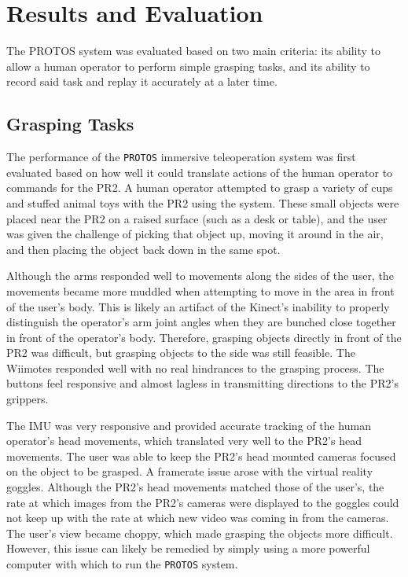 \documentclass{sig-alternate}
\begin{document}
\section{Results and Evaluation}
\label{sec:results}
The PROTOS system was evaluated based on two main criteria: its ability to allow a human operator to perform simple grasping tasks, and its ability to record said task
and replay it accurately at a later time. 

\subsection{Grasping Tasks}
\indent The performance of the {\tt PROTOS} immersive teleoperation system was first
evaluated based on how well it could translate actions of
the human operator to commands for the PR2. A human operator attempted to grasp a variety of cups and stuffed animal toys 
with the PR2 using the system. These small objects were placed near the PR2 on a raised surface (such as a desk or table), and the user was given the challenge of
picking that object up, moving it around in the air, and then placing the object back down in the same spot.

\indent Although the arms responded well to movements along the sides of the user, the movements became more
muddled when attempting to move in the area in front of the user's body. This is likely an artifact of the Kinect's inability to properly distinguish the operator's arm 
joint angles when they are bunched close together in front of the operator's body. Therefore, grasping objects directly in front of the PR2 was difficult, but grasping
objects to the side was still feasible. The Wiimotes responded well with no real hindrances to the grasping process. The buttons feel responsive and almost lagless in
transmitting directions to the PR2's grippers.

\indent The IMU was very responsive and provided accurate tracking of the human operator's head movements, which translated very well to the PR2's head movements. The user 
was able to keep the PR2's head mounted cameras focused on the object to be grasped. A framerate issue arose with the virtual reality goggles. Although the PR2's head movements
matched those of the user's, the rate at which images from the PR2's cameras were displayed to the goggles could not keep up with the rate at which new video was coming
in from the cameras. The user's view became choppy, which made grasping the objects more difficult. However, this issue can likely be remedied by simply using a more
powerful computer with which to run the {\tt PROTOS} system.
\end{document}
